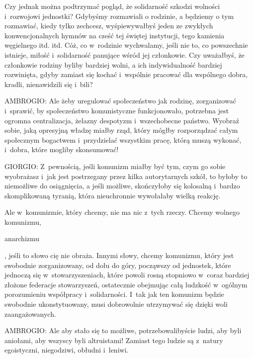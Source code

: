 \documentclass[oneside,polish,11pt,sfheadings]{mwbk}
\begin{document}
 
Czy jednak można podtrzymać pogląd, że solidarność szkodzi wolności i~rozwojowi jednostki? Gdybyśmy rozmawiali o
rodzinie, a będziemy o tym rozmawiać, kiedy tylko zechcesz, wyśpiewywałbyś jeden ze zwykłych konwencjonalnych hymnów na
cześć tej świętej instytucji, tego kamienia węgielnego itd. itd.  Cóż, co w~rodzinie wychwalamy, jeśli nie to, co
powszechnie istnieje, miłość i~solidarność panujące wśród jej członkowie. Czy uważałbyś, że członkowie rodziny byliby
bardziej wolni, a ich indywidualność bardziej rozwinięta, gdyby zamiast się kochać i~wspólnie pracować dla wspólnego
dobra, kradli, nienawidzili się i~bili? 




 
\noindent AMBROGIO: Ale żeby uregulować społeczeństwo jak rodzinę, zorganizować i~sprawić, by społeczeństwo komunistyczne
funkcjonowało, potrzebna jest ogromna centralizacja, żelazny despotyzm i~wszechobecne państwo. Wyobraź sobie, jaką
opresyjną władzę miałby rząd, który mógłby rozporządzać całym społecznym bogactwem i~przydzielać wszystkim pracę, którą
muszą wykonać, i~dobra, które mogliby skonsumować! 




 
\noindent GIORGIO: Z~pewnością, jeśli komunizm miałby być tym, czym go sobie wyobrażasz i~jak jest postrzegany przez kilka
autorytarnych szkół, to byłoby to niemożliwe do osiągnięcia, a jeśli możliwe, skończyłoby się kolosalną i~bardzo
skomplikowaną tyranią, która nieuchronnie wywołałaby wielką reakcję. 

 
Ale w~komunizmie, który chcemy, nie ma nic z~tych rzeczy. Chcemy wolnego komunizmu,
\begin{itshape}anarchizmu \end{itshape}, jeśli to słowo cię nie obraża. Innymi słowy, chcemy
komunizmu, który jest swobodnie zorganizowany, od dołu do góry, począwszy od jednostek, które jednoczą się w~stowarzyszeniach, które powoli rosną stopniowo w~coraz bardziej złożone federacje stowarzyszeń, ostatecznie obejmując
całą ludzkość w~ogólnym porozumieniu współpracy i~solidarności. I~tak jak ten komunizm będzie swobodnie ukonstytuowany,
musi dobrowolnie utrzymywać się dzięki woli zaangażowanych. 




 
\noindent AMBROGIO: Ale aby stało się to możliwe, potrzebowalibyście ludzi, aby byli aniołami, aby wszyscy byli altruistami!
Zamiast tego ludzie są z~natury egoistyczni, niegodziwi, obłudni i~leniwi. 
\end{document}
